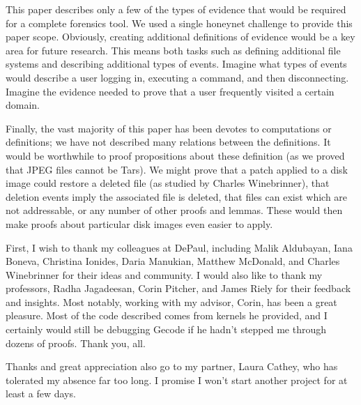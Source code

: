 \documentclass[nocopyrightspace]{sigplanconf}
\begin{document}
This paper describes only a few of the types of evidence that would be
required for a complete forensics tool. We used a single honeynet challenge to
provide this paper scope. Obviously, creating additional definitions of
evidence would be a key area for future research. This means both tasks such
as defining additional file systems and describing additional types of events.
Imagine what types of events would describe a user logging in, executing a
command, and then disconnecting. Imagine the evidence needed to prove that a
user frequently visited a certain domain.

Finally, the vast majority of this paper has been devotes to computations or
definitions; we have not described many relations between the definitions. It
would be worthwhile to proof propositions about these definition (as we proved
that JPEG files cannot be Tars). We might prove that a patch applied to a disk
image could restore a deleted file (as studied by Charles Winebrinner), that
deletion events imply the associated file is deleted, that files can exist
which are not addressable, or any number of other proofs and lemmas. These
would then make proofs about particular disk images even easier to apply.

\appendix

\acks
First, I wish to thank my colleagues at DePaul, including Malik Aldubayan,
Iana Boneva, Christina Ionides, Daria Manukian, Matthew McDonald, and Charles
Winebrinner for their ideas and community. I would also like to thank my
professors, Radha Jagadeesan, Corin Pitcher, and James Riely for their
feedback and insights. Most notably, working with my advisor, Corin, has been
a great pleasure. Most of the code described comes from kernels he provided,
and I certainly would still be debugging Gecode if he hadn't stepped me
through dozens of proofs. Thank you, all.

Thanks and great appreciation also go to my partner, Laura Cathey, who has
tolerated my absence far too long. I promise I won't start another project for
at least a few days.




\end{document}
